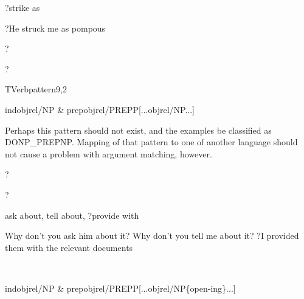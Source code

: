 
\begin{thetadescr}
\evitem ?strike as
\esitem
     \begin{examples}
        \example ?He struck me as pompous
     \end{examples}
\end{thetadescr}



\begin{thetadescr}
\evitem ?
\esitem
     \begin{examples}
        \example ?
     \end{examples}
\end{thetadescr}


\newpage
{}
\begin{vpattern}
 TVerbpattern9,2
\csritem \mbox{}\\
     \begin{csr}
      indobjrel/NP & prepobjrel/PREPP[...objrel/NP...]
     \end{csr}
\remarksitem Perhaps this pattern should not exist, and the examples be 
classified as DONP\_PREPNP. Mapping of that pattern to one of another language 
should not cause a problem with argument matching, however.
\end{vpattern}


\begin{thetadescr}
\evitem ?
\esitem
     \begin{examples}
        \example ?
     \end{examples}
\end{thetadescr}



\begin{thetadescr}
\evitem ask about, tell about, 
?provide with
\esitem
     \begin{examples}
        \example Why don't you ask him about it?
        \example Why don't you tell me about it?
        \example ?I provided them with the relevant documents
     \end{examples}
\end{thetadescr}


\newpage
{}
\begin{vpattern}
 \norule
\csritem \mbox{}\\
     \begin{csr}
      indobjrel/NP & prepobjrel/PREPP[...objrel/NP\{open-ing\}...]
     \end{csr}
\remarksitem 
\end{vpattern}

